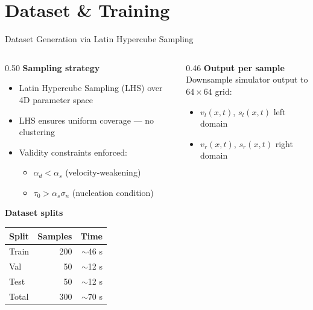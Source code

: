 \documentclass[aspectratio=169,12pt]{beamer}
\begin{document}
\section{Dataset \& Training}

\begin{frame}{Dataset Generation via Latin Hypercube Sampling}
  \begin{columns}[T]
    \begin{column}{0.50\textwidth}
      \textbf{Sampling strategy}
      \begin{itemize}
        \item Latin Hypercube Sampling (LHS) over 4D parameter space
        \item LHS ensures uniform coverage — no clustering
        \item Validity constraints enforced:
          \begin{itemize}\small
            \item $\alpha_d < \alpha_s$ (velocity-weakening)
            \item $\tau_0 > \alpha_s\sigma_n$ (nucleation condition)
          \end{itemize}
      \end{itemize}
      \vspace{6pt}
      \textbf{Dataset splits}
      \begin{center}
      \small
      \begin{tabular}{lrr}
        \toprule
        Split & Samples & Time \\
        \midrule
        Train & 200 & $\sim$46 s \\
        Val   &  50 & $\sim$12 s \\
        Test  &  50 & $\sim$12 s \\
        \midrule
        Total & 300 & $\sim$70 s \\
        \bottomrule
      \end{tabular}
      \end{center}
    \end{column}
    \begin{column}{0.46\textwidth}
      \textbf{Output per sample}\\[4pt]
      \small
      Downsample simulator output to $64\times64$ grid:
      \begin{itemize}
        \item $v_l(x,t)$, $s_l(x,t)$ \hfill left domain
        \item $v_r(x,t)$, $s_r(x,t)$ \hfill right domain

\end{itemize}
\end{column}
\end{columns}
\end{frame}
\end{document}
